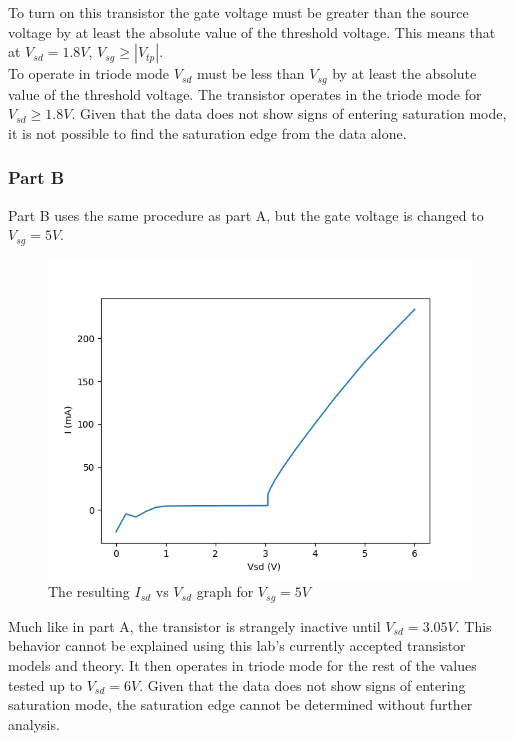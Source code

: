 \FloatBarrier
To turn on this transistor the gate voltage must be greater than the source voltage by at least the absolute value of the threshold voltage. 
This means that at $V_{sd} = 1.8 V$, $V_{sg} \ge |V_{tp}|$.
\\

To operate in triode mode $V_{sd}$ must be less than $V_{sg}$ by at least the absolute value of the threshold voltage.
The transistor operates in the triode mode for $ V_{sd} \ge 1.8V$.
Given that the data does not show signs of entering saturation mode, it is not possible to find the saturation edge from the data alone.
\\

\subsubsection{Part B}
Part B uses the same procedure as part A, but the gate voltage is changed to $V_{sg} = 5 V$. 

\FloatBarrier

\begin{figure}[h!]
	\centering
	\includegraphics[scale=0.75]{./data/pmos_5v.png}
	\caption{The resulting $I_{sd}$ vs $V_{sd}$ graph for $V_{sg}=5V$}
	\label{fig:pmos_5v}
\end{figure}

\FloatBarrier
Much like in part A, the transistor is strangely inactive until $V_{sd} = 3.05 V$. This behavior cannot be explained using this lab's currently accepted transistor models and theory.
It then operates in triode mode for the rest of the values tested up to $V_{sd}=6V$.
Given that the data does not show signs of entering saturation mode, the saturation edge cannot be determined without further analysis.
